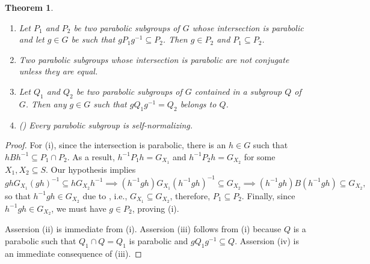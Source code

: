 \documentclass{article}
\theoremstyle{thmstyle}
\newtheorem{theorem}{Theorem}[section]
\theoremstyle{defstyle}
\begin{document}
\begin{theorem}
\begin{enumerate}[label=(\roman*)]
    \item Let $P_1$ and $P_2$ be two parabolic subgroups of $G$ whose intersection is parabolic and let $g\in G$ be such that $gP_1g^{-1}\subseteq P_2$. Then $g\in P_2$ and $P_1\subseteq P_2$.
    \item Two parabolic subgroups whose intersection is parabolic are not conjugate unless they are equal.
    \item Let $Q_1$ and $Q_2$ be two parabolic subgroups of $G$ contained in a subgroup $Q$ of $G$. Then any $g\in G$ such that $gQ_1g^{-1} = Q_2$ belongs to $Q$.
    \item \big(\cite[2.3.6]{macdonald-spherical-functions}\big) Every parabolic subgroup is self-normalizing.
\end{enumerate}
\end{theorem}
\begin{proof}
    For (i), since the intersection is parabolic, there is an $h\in G$ such that $hBh^{-1}\subseteq P_1\cap P_2$. As a result, $h^{-1}P_1h = G_{X_1}$ and $h^{-1}P_2h = G_{X_2}$ for some $X_1, X_2\subseteq S$. Our hypothesis implies 
    \begin{equation*}
        ghG_{X_1}(gh)^{-1}\subseteq hG_{X_2}h^{-1}\implies (h^{-1}gh)G_{X_1}(h^{-1}gh)^{-1}\subseteq G_{X_2}\implies (h^{-1}gh)B(h^{-1}gh)\subseteq G_{X_2},
    \end{equation*}
    so that $h^{-1}gh\in G_{X_2}$ due to , i.e., $G_{X_1}\subseteq G_{X_2}$, therefore, $P_1\subseteq P_2$. Finally, since $h^{-1}gh\in G_{X_2}$, we must have $g\in P_2$, proving (i).

    Assersion (ii) is immediate from (i). Assersion (iii) follows from (i) because $Q$ is a parabolic such that $Q_1\cap Q = Q_1$ is parabolic and $gQ_1g^{-1}\subseteq Q$. Assersion (iv) is an immediate consequence of (iii).
\end{proof}



\end{document}
